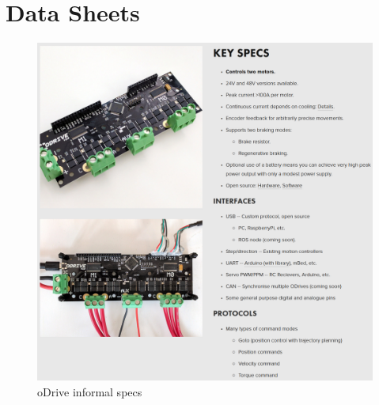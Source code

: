 \section{Data Sheets}










\begin{figure}[H]
    \centering
    \includegraphics[width=\textwidth]{6_Appendices/DataSheets/oDriveSpecs.png}
    \caption{oDrive informal specs}
    \label{fig:app_sec:odrive_specs}
\end{figure}{}